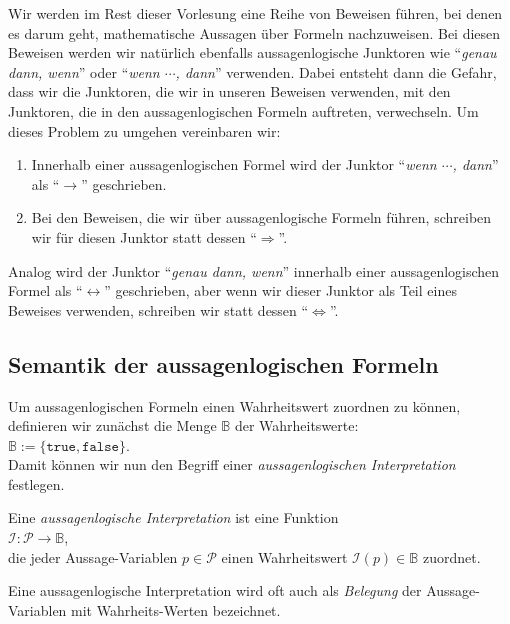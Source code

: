 \remark
Wir werden im Rest dieser Vorlesung eine Reihe von Beweisen f\"{u}hren, bei denen es darum geht,
mathematische Aussagen \"{u}ber Formeln nachzuweisen.  Bei diesen Beweisen werden wir nat\"{u}rlich
ebenfalls aussagenlogische Junktoren wie ``\emph{\color{blue}genau dann, wenn}'' oder 
``\emph{\color{blue}wenn $\cdots$,  dann}'' verwenden.  Dabei entsteht dann die Gefahr, dass wir die Junktoren,
die wir in unseren Beweisen verwenden, mit den Junktoren, die in den aussagenlogischen Formeln
auftreten, verwechseln.  Um dieses Problem zu umgehen vereinbaren wir:
\begin{enumerate}
\item Innerhalb einer aussagenlogischen Formel wird der Junktor  
      ``\emph{\color{blue}wenn $\cdots$,  dann}'' als ``$\rightarrow$''  geschrieben.
\item Bei den Beweisen, die wir \"{u}ber aussagenlogische Formeln f\"{u}hren, schreiben wir f\"{u}r diesen
      Junktor statt dessen ``$\Rightarrow$''.
\end{enumerate}
Analog wird der Junktor ``\emph{\color{blue}genau dann, wenn}'' innerhalb einer aussagenlogischen Formel als
``$\leftrightarrow$'' geschrieben, aber wenn wir dieser Junktor als Teil eines Beweises verwenden,
schreiben wir statt dessen ``$\Leftrightarrow$''. \eox

\subsection{Semantik der aussagenlogischen Formeln}
Um aussagenlogischen Formeln einen Wahrheitswert zuordnen zu k\"{o}nnen, definieren wir
zun\"{a}chst die Menge $\mathbb{B}$ der Wahrheitswerte:  \\[0.2cm] 
\hspace*{1.3cm} $\mathbb{B} := \{ \texttt{true}, \texttt{false} \}$. \\[0.2cm]
Damit k\"{o}nnen wir nun
den Begriff einer \emph{\color{blue}aussagenlogischen Interpretation} festlegen.

\begin{Definition}
  Eine \emph{\color{blue}aussagenlogische Interpretation} ist eine Funktion \\[0.2cm]
  \hspace*{1.3cm} $\mathcal{I}:\mathcal{P} \rightarrow \mathbb{B}$, \\[0.2cm]
  die jeder Aussage-Variablen $p\in \mathcal{P}$ einen Wahrheitswert $\mathcal{I}(p) \in \mathbb{B}$ zuordnet.
  \eox
\end{Definition}
Eine aussagenlogische Interpretation wird oft auch als \emph{\color{blue}Belegung} der
Aussage-Variablen mit Wahr\-heits-Werten bezeichnet.  

